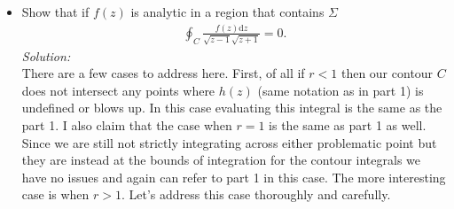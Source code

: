 \documentclass[10pt]{amsart}
\newcommand{\D}{\mathrm{d}}
\theoremstyle{nonumberplain}
\begin{document}
\begin{enumerate}[label={\bf {\arabic*}:}]
\begin{itemize}
  \item Show that if $f(z)$ is analytic in a region that contains $\Sigma$
    \begin{align*}
        \oint_C \frac{f(z) \D z}{\sqrt{z-1} \sqrt{z+1}}= 0.
      \end{align*}
\textit{Solution:} \\
There are a few cases to address here.
First, of all if $r < 1$ then our contour $C$ does not intersect any points where $h(z)$ (same notation as in part 1) is undefined or blows up.
In this case evaluating this integral is the same as the part 1.
I also claim that the case when $r=1$ is the same as part 1 as well.
Since we are still not strictly integrating across either problematic point but they are instead at the bounds of integration for the contour integrals we have no issues and again can refer to part 1 in this case.
The more interesting case is when $r > 1$.
Let's address this case thoroughly and carefully. \\


\end{itemize}
\end{enumerate}
\end{document}
